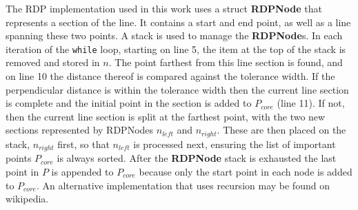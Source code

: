 The RDP implementation used in this work uses a struct \textbf{RDPNode} that represents a section of the line.
It contains a start and end point, as well as a line spanning these two points.
A stack is used to manage the \textbf{RDPNode}s.
In each iteration of the \verb|while| loop, starting on line 5, the item at the top of the stack is removed and stored in $n$.
The point farthest from this line section is found, and on line 10 the distance thereof is compared against the tolerance width.
If the perpendicular distance is within the tolerance width then the current line section is complete and the initial point in the section is added to $P_{core}$ (line 11).
If not, then the current line section is split at the farthest point, with the two new sections represented by RDPNodes $n_{left}$ and $n_{right}$.
These are then placed on the stack, $n_{right}$ first, so that $n_{left}$ is processed next, ensuring the list of important points $P_{core}$ is always sorted.
After the \textbf{RDPNode} stack is exhausted the last point in $P$ is appended to $P_{core}$ because only the start point in each node is added to $P_{core}$.
An alternative implementation that uses recursion may be found on wikipedia.

